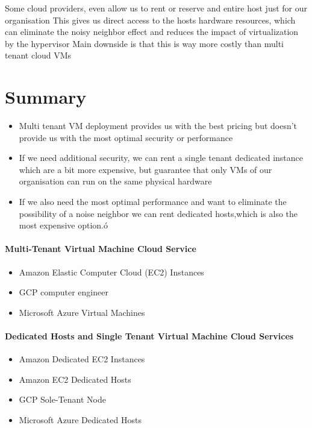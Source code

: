 \documentclass[a4paper, 11pt]{book}
\begin{document}
    Some cloud providers, even allow us to rent or reserve and entire host just for our organisation
    This gives us direct access to the hosts hardware resources, which can eliminate the noisy neighbor effect and reduces the impact of virtualization by the hypervisor
    Main downside is that this is way more costly than multi tenant cloud VMs


    \section{Summary}
    \begin{itemize}
        \item Multi tenant VM deployment provides us with the best pricing but doesn't provide us with the most optimal security or performance
        \item If we need additional security, we can rent a single tenant dedicated instance which are a bit more expensive, but guarantee that only VMs of our organisation can run on the same physical hardware
        \item If we also need the most optimal performance and want to eliminate the possibility of a noise neighbor we can rent dedicated hosts,which is also the most expensive option.ó
    \end{itemize}

    \paragraph{Multi-Tenant Virtual Machine Cloud Service}
    \begin{itemize}
        \item Amazon Elastic Computer Cloud (EC2) Instances
        \item GCP computer engineer
        \item Microsoft Azure Virtual Machines
    \end{itemize}

    \paragraph{Dedicated Hosts and Single Tenant Virtual Machine Cloud Services}
    \begin{itemize}
        \item Amazon Dedicated EC2 Instances
        \item Amazon EC2 Dedicated Hosts
        \item GCP Sole-Tenant Node
        \item Microsoft Azure Dedicated Hosts
    \end{itemize}
\end{document}
